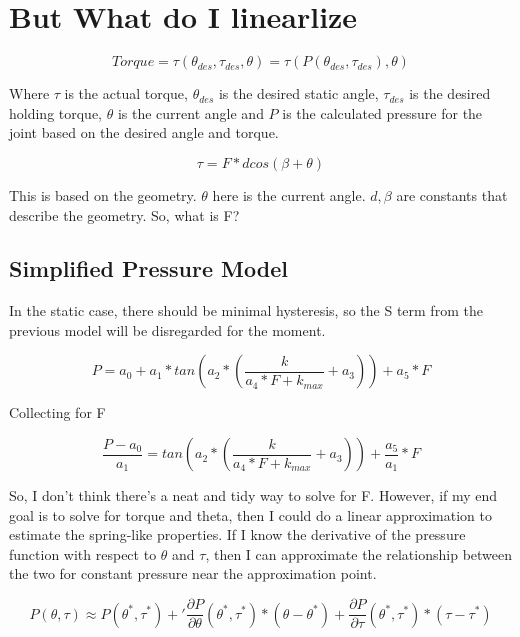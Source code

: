 \documentclass[12pt, letterpaper, oneside, notitlepage, onecolumn]{article}
\begin{document}
\section{But What do I linearlize}

\begin{equation}
Torque = \tau(\theta_{des}, \tau_{des}, \theta) = \tau(P(\theta_{des},
\tau_{des}), \theta)
\end{equation}

Where $\tau$ is the actual torque, $\theta_{des}$ is the desired static angle, 
$\tau_{des}$ is the desired holding torque, $\theta$ is the current angle and
$P$ is the calculated pressure for the joint based on the desired angle and
torque.

\begin{equation}
\tau = F * d cos(\beta + \theta)
\end{equation}

This is based on the geometry. $\theta$ here is the current angle. $d, \beta$
are constants that describe the geometry. So, what is F?

\subsection{Simplified Pressure Model}

In the static case, there should be minimal hysteresis, so the S term from the
previous model will be disregarded for the moment.

\begin{equation}
P = a_{0} + a_{1} * tan(a_{2} * (\dfrac{k}{a_{4} * F + k_{max}} + a_{3})) + a_{5} * F
\end{equation}

Collecting for F

\begin{equation}
\dfrac{P - a_{0}}{a_{1}} = tan(a_{2} * (\dfrac{k}{a_{4} * F + k_{max}} + a_{3})) +
\dfrac{a_{5}}{a_{1}} * F
\end{equation}

So, I don't think there's a neat and tidy way to solve for F. However, if my end
goal is to solve for torque and theta, then I could do a linear approximation to
estimate the spring-like properties. If I know the derivative of the pressure
function with respect to $\theta$ and $\tau$, then I can approximate the
relationship between the two for constant pressure near the approximation point.

\begin{equation}
P(\theta, \tau) \approx P(\theta^{*}, \tau^{*}) + '
\dfrac{\partial P}{\partial \theta}(\theta^{*}, \tau^{*}) * (\theta -\theta^{*}) +
\dfrac{\partial P}{\partial \tau}(\theta^{*}, \tau^{*}) * (\tau - \tau^{*})
\end{equation}
\end{document}
